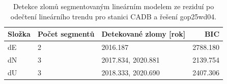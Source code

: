 \begin{table}[htbp]
\caption{Detekce zlomů segmentovaným lineárním modelem ze reziduí po odečtení lineárního trendu pro stanici CADB a řešení gop25wd04.}
\label{tab:gop25wd04_stcd_cadb_detr_weighted_1seg_jumps_piecewise_bic}
\begin{tabular}{lllr}
\toprule
Složka & Počet segmentů & Detekované zlomy [rok] & BIC \\
\midrule
dE & 2 & 2016.187 & 2788.180 \\
dN & 3 & 2017.834, 2020.881 & 2139.754 \\
dU & 3 & 2018.333, 2020.690 & 2407.306 \\
\bottomrule
\end{tabular}
\end{table}
